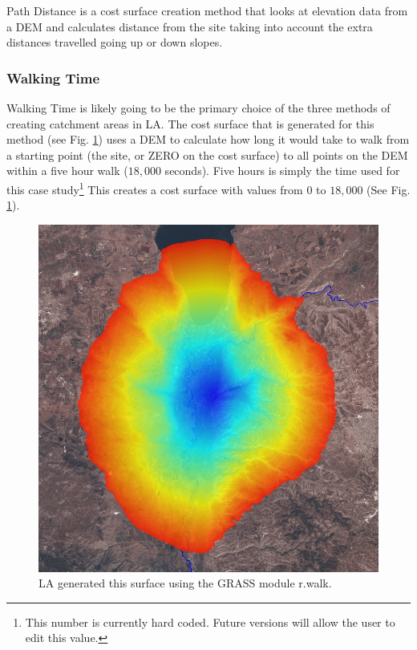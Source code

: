   Path Distance is a cost surface creation method that looks at elevation data
  from a DEM and calculates distance from the site taking into account the
  extra distances travelled going up or down slopes.

  \subsubsection{Walking Time}
  
  Walking Time is likely going to be the primary choice of the three methods of
  creating catchment areas in LA.  The cost surface that is
  generated for this method (see Fig. \ref{fig:rwalk}) uses a DEM to calculate
  how long it would take to walk from a starting point (the site, or ZERO on
  the cost surface) to all points on the DEM within a five hour walk ($18,000$
  seconds). Five hours is simply the time used for this case
  study\footnote{This number is currently hard coded. Future versions will
  allow the user to edit this value.} This creates a cost surface with values
  from $0$ to $18,000$ (See Fig. \ref{fig:rwalk}).  

\begin{figure}[htbp] \centering
\includegraphics[scale=0.29]{./images/rwalkShuna.jpg}
   \caption{\label{fig:rwalk}LA generated this surface using the GRASS module r.walk.}
    \end{figure}

